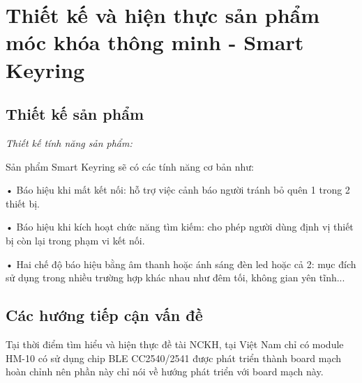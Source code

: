 
\chapter{Thiết kế và hiện thực \newline sản phẩm móc khóa thông minh - Smart Keyring}

\ifpdf
    \graphicspath{{Chapter2/Figs/Raster/}{Chapter2/Figs/PDF/}{Chapter2/Figs/}}
\else
    \graphicspath{{Chapter2/Figs/Vector/}{Chapter2/Figs/}}
\fi


\section{Thiết kế sản phẩm}
\textit{Thiết kế tính năng sản phẩm:}

\label{feature}
Sản phẩm Smart Keyring sẽ có các tính năng cơ bản như:

• Báo hiệu khi mất kết nối: hỗ trợ việc cảnh báo người tránh bỏ quên 1 trong 2 thiết bị.

• Báo hiệu khi kích hoạt chức năng tìm kiếm: cho phép người dùng định vị thiết bị còn lại trong phạm vi kết nối.

• Hai chế độ báo hiệu bằng âm thanh hoặc ánh sáng đèn led hoặc cả 2: mục đích sử dụng trong nhiều trường hợp khác nhau như đêm tối, không gian yên tĩnh...
\section{Các hướng tiếp cận vấn đề}

Tại thời điểm tìm hiểu và hiện thực đề tài NCKH, tại Việt Nam chỉ có module HM-10 có sử dụng chip BLE CC2540/2541 được phát triển thành board mạch hoàn chỉnh nên phần này chỉ nói về hướng phát triển với board mạch này.

